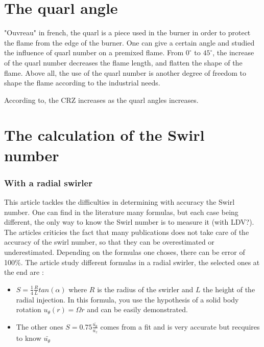 \section{The quarl angle}

"Ouvreau" in french, the quarl is a piece used in the burner in order to protect the flame from the edge of the burner. One can give a certain angle and \cite{paul_jourdaine_nom_effect_2016} studied the influence of quarl number on a premixed flame. From $0^\circ $ to $45^\circ $, the increase of the quarl number decreases the flame length, and flatten the shape of the flame. Above all, the use of the quarl number is another degree of freedom to shape the flame according to the industrial needs.

According to\cite{milosavljevic_influence_1990}, the CRZ increases as the quarl angles increases.	

\section{The calculation of the Swirl number}

\subsubsection{With a radial swirler}

\cite{durox_flame_2013} This article tackles the difficulties in determining with accuracy the Swirl number. One can find in the literature many formulas, but each case being different, the only way to know the Swirl number is to measure it (with LDV?). The articles criticies the fact that many publications does not take care of the accuracy of the swirl number, so that they can be overestimated or underestimated. Depending on the formulas one choses, there can be error of 100\%. The article study different formulas in a radial swirler, the selected ones at the end are :

\begin{itemize}
\item $S=\frac{1}{4} \frac{R}{L} tan(\alpha)$ where $R$ is the radius of the swirler and $L$ the height of the radial injection. In this formula, you use the hypothesis of a solid body rotation $u_{\theta}(r)=\Omega r$ and can be easily demonstrated.
\item The other ones $S=0.75\frac{\bar{u_{\theta}}}{\bar{u_{z}}}$ comes from a fit and is very accurate but recquires to know $\bar{u_{\theta}}$
\end{itemize}

